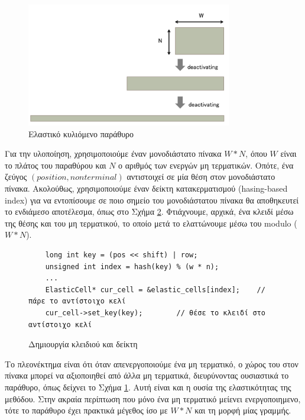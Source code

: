 \begin{figure}[h]
	\centering
	\includegraphics[width=0.8\textwidth]{pics/elastic_slide_window} 
	\caption{Ελαστικό κυλιόμενο παράθυρο}
	\label{fig:elastic_slide_window}
\end{figure}

Για την υλοποίηση, χρησιμοποιούμε έναν μονοδιάστατο πίνακα $W*N$, όπου $W$ είναι το πλάτος του παραθύρου και $N$ ο αριθμός των ενεργών μη τερματικών.
Οπότε, ένα ζεύγος $(position, non terminal)$ αντιστοιχεί σε μία θέση στον μονοδιάστατο πίνακα.
Ακολούθως, χρησιμοποιούμε έναν δείκτη κατακερματισμού (hasing-based index) για να εντοπίσουμε σε ποιο σημείο του μονοδιάστατου πίνακα θα αποθηκευτεί το ενδιάμεσο αποτέλεσμα, όπως στο Σχήμα \ref{fig:elastic_1}.
Φτιάχνουμε, αρχικά, ένα κλειδί μέσω της θέσης και του μη τερματικού, το οποίο μετά το ελαττώνουμε μέσω του modulo ($W*N$).

\begin{figure}[h]
\setlength\partopsep{-\topsep}%
\begin{verbatim}
    long int key = (pos << shift) | row;
    unsigned int index = hash(key) % (w * n);
    ...
    ElasticCell* cur_cell = &elastic_cells[index];    // πάρε το αντίστοιχο κελί
    cur_cell->set_key(key);        // θέσε το κλειδί στο αντίστοιχο κελί
\end{verbatim}
\caption{Δημιουργία κλειδιού και δείκτη}
\label{fig:elastic_1}
\end{figure}

Το πλεονέκτημα είναι ότι όταν απενεργοποιούμε ένα μη τερματικό, ο χώρος του στον πίνακα μπορεί να αξιοποιηθεί από άλλα μη τερματικά, διευρύνοντας ουσιαστικά το παράθυρο, όπως δείχνει το Σχήμα \ref{fig:elastic_slide_window}. 
Αυτή είναι και η ουσία της ελαστικότητας της μεθόδου. 
Στην ακραία περίπτωση που μόνο ένα μη τερματικό μείενει ενεργοποιημενο, τότε το παράθυρο έχει πρακτικά μέγεθος ίσο με $W*N$ και τη μορφή μίας γραμμής.

